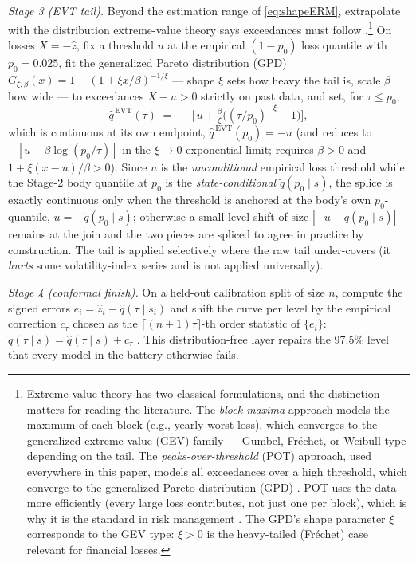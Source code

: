 \documentclass[11pt]{article}
\theoremstyle{remark}
\begin{document}
\emph{Stage 3 (EVT tail).} Beyond the estimation range of
\eqref{eq:shapeERM}, extrapolate with the distribution extreme-value
theory says exceedances must follow \citep{pickands1975,
mcneilfrey2000}.\footnote{Extreme-value theory has two classical
formulations, and the distinction matters for reading the literature.
The \emph{block-maxima} approach models the maximum of each block (e.g.,
yearly worst loss), which converges to the generalized extreme value
(GEV) family --- Gumbel, Fr\'echet, or Weibull type depending on the
tail. The \emph{peaks-over-threshold} (POT) approach, used everywhere in
this paper, models all exceedances over a high threshold, which converge
to the generalized Pareto distribution (GPD)
\citep{balkema1974,pickands1975}. POT uses the data more efficiently
(every large loss contributes, not just one per block), which is why it
is the standard in risk management \citep{mcneilfrey2000,
embrechts1997}. The GPD's shape parameter $\xi$ corresponds to the
GEV type: $\xi>0$ is the heavy-tailed (Fr\'echet) case relevant for
financial losses.} On losses $X=-\widehat{z}$, fix a threshold $u$ at the
empirical $(1-p_0)$ loss quantile with $p_0 = 0.025$, fit the
generalized Pareto distribution (GPD)
$G_{\xi,\beta}(x) = 1-(1+\xi x/\beta)^{-1/\xi}$ --- shape $\xi$ sets how
heavy the tail is, scale $\beta$ how wide --- to exceedances
$X - u > 0$ strictly on past data, and set, for $\tau \le p_0$,
\begin{equation}
\widehat{q}^{\,\mathrm{EVT}}(\tau)
\;=\; -\Big[\, u + \tfrac{\beta}{\xi}\big( (\tau/p_0)^{-\xi} - 1 \big)
\Big],
\label{eq:evt}
\end{equation}
which is continuous at its own endpoint, $\widehat q^{\,\mathrm{EVT}}(p_0)
= -u$ (and reduces to $-[u+\beta\log(p_0/\tau)]$ in the $\xi\to0$
exponential limit; requires $\beta>0$ and $1+\xi(x-u)/\beta>0$). Since
$u$ is the \emph{unconditional} empirical loss threshold while the
Stage-2 body quantile at $p_0$ is the \emph{state-conditional}
$\widetilde q(p_0\mid s)$, the splice is exactly continuous only when
the threshold is anchored at the body's own $p_0$-quantile,
$u = -\widetilde q(p_0\mid s)$; otherwise a small level shift of size
$|{-}u - \widetilde q(p_0\mid s)|$ remains at the join and the two
pieces are spliced to agree in practice by construction. The tail is
applied selectively where the raw tail under-covers (it \emph{hurts}
some volatility-index series and is not applied universally).

\emph{Stage 4 (conformal finish).} On a held-out calibration split of
size $n$, compute the signed errors
$e_i = \widehat{z}_i - \widehat{q}(\tau \mid s_i)$ and shift the curve
per level by the empirical correction $c_\tau$ chosen as the
$\lceil (n{+}1)\tau \rceil$-th order statistic of $\{e_i\}$:
$\widetilde{q}(\tau \mid s) = \widehat{q}(\tau \mid s) + c_\tau$
\citep{vovk2005, romano2019cqr}. This distribution-free layer repairs
the 97.5\% level that every model in the battery otherwise fails.
\end{document}
